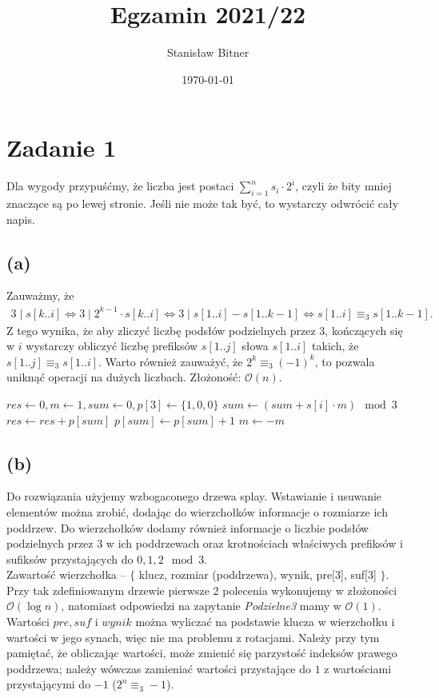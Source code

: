 \documentclass[12pt, a4paper]{article}
\title{Egzamin 2021/22}
\author{Stanisław Bitner}
\date{\today}
\newcommand{\MCALO}{\mathcal{O}}
\begin{document}
\maketitle

\section*{Zadanie 1}
Dla wygody przypuśćmy, że liczba jest postaci $\sum_{i=1}^n s_i \cdot 2^i$, czyli że
bity mniej znaczące są po lewej stronie. Jeśli nie może tak być, to wystarczy odwrócić cały napis.
\subsection*{(a)}
Zauważmy, że
\begin{align*}
  3 \mid s[k..i] \iff 3 \mid 2^{k-1} \cdot s[k..i] \iff 3 \mid s[1..i] - s[1..k-1]
  \iff s[1..i] \equiv_3 s[1..k-1].
\end{align*}
Z tego wynika, że aby zliczyć liczbę podsłów podzielnych przez 3, kończących się w $i$ wystarczy
obliczyć liczbę prefiksów $s[1..j]$ słowa $s[1..i]$ takich, że $s[1..j] \equiv_3 s[1..i]$.
Warto również zauważyć, że $2^k\equiv_3 (-1)^k$, to pozwala uniknąć operacji na dużych liczbach.
Złożoność: $\MCALO(n)$.

\begin{algorithmic}
\State $res \gets 0, m \gets 1, sum \gets 0, p[3] \gets \{1,0,0\}$
  \State $sum \gets (sum + s[i] \cdot m) \mod 3$
  \State $res \gets res + p[sum]$
  \State $p[sum] \gets p[sum] + 1$
  \State $m \gets -m$
\EndFor
\end{algorithmic}

\subsection*{(b)}
Do rozwiązania użyjemy wzbogaconego drzewa splay.
Wstawianie i usuwanie elementów można zrobić, dodając do wierzchołków informacje
o rozmiarze ich poddrzew. Do wierzchołków dodamy również informacje o liczbie podsłów
podzielnych przez 3 w ich poddrzewach oraz krotnościach właściwych prefiksów i sufiksów przystających
do $0,1,2 \mod 3$.\\
Zawartość wierzchołka --
$\{$ klucz, rozmiar (poddrzewa), wynik, pre[3], suf[3] $\}$.
Przy tak zdefiniowanym drzewie pierwsze 2 polecenia wykonujemy w złożoności
$\MCALO(\log{n})$, natomiast odpowiedzi na zapytanie \textit{Podzielne3} mamy
w $\MCALO(1)$.\\ Wartości $pre, suf$ i $wynik$ można wyliczać na podstawie
klucza w wierzchołku i wartości w jego synach, więc nie ma problemu
z rotacjami. Należy przy tym pamiętać, że obliczając wartości, może zmienić się
parzystość indeksów prawego poddrzewa; należy wówczas zamieniać wartości
przystające do $1$ z wartościami przystającymi do $-1$ ($2^n\equiv_3 -1$).
\end{document}
